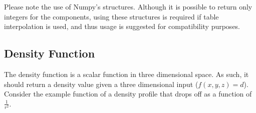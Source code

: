 \documentclass[letterpaper,10pt,english]{sphinxmanual}
\begin{document}
Please note the use of Numpy’s structures. Although it is possible to return only integers for the components, using these structures is required if table interpolation is used, and thus usage is suggested for compatibility purposes.

%
\begin{sphinxVerbatim}[commandchars=\\\{\}]
   

 
      
      
      

     
\end{sphinxVerbatim}


\subsection{Density Function}
\label{\detokenize{quickstart:density-function}}
The density function is a scalar function in three dimensional space. As such, it should return a density value given a three dimensional input (\(f(x,y,z) = d\)). Consider the example function of a density profile that drops off as a function of \(\frac{1}{r^2}\).

%
\begin{sphinxVerbatim}[commandchars=\\\{\}]
   

 
      \PYG{p}{[}\PYG{p}{]}\PYG{p}{[}\PYG{p}{]}


     
\end{sphinxVerbatim}
\end{document}
